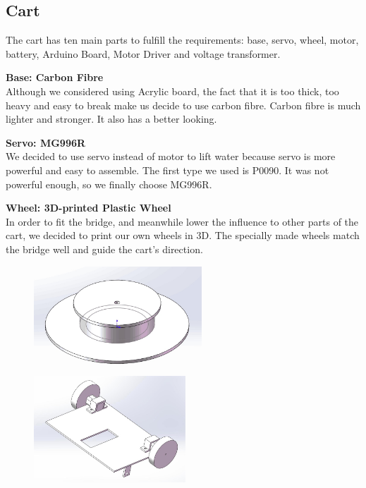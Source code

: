 \subsection{Cart}

The cart has ten main parts to fulfill the requirements: base, servo, wheel,
motor, battery, Arduino Board, Motor Driver and voltage transformer.

\medskip
\noindent
\textbf{Base: Carbon Fibre} \\
\indent
Although we considered using Acrylic board, the fact that it is too thick, too
heavy and easy to break make us decide to use carbon fibre.
Carbon fibre is much lighter and stronger.
It also has a better looking. 

\medskip
\noindent
\textbf{Servo: MG996R}  \\
\indent
We decided to use servo instead of motor to lift water because servo is more
powerful and easy to assemble. 
The first type we used is P0090.
It was not powerful enough, so we finally choose MG996R. 

\medskip
\noindent
\textbf{Wheel: 3D-printed Plastic Wheel } \\
\indent
In order to fit the bridge, and meanwhile lower the influence to other parts of
the cart, we decided to print our own wheels in 3D.
The specially made wheels match the bridge well and guide the cart’s direction.

\begin{figure}[H]
\begin{center}
\includegraphics[height=4cm]{figure/designOverview/p2}
\includegraphics[height=4cm]{figure/designOverview/p1}
\end{center}
\end{figure}

